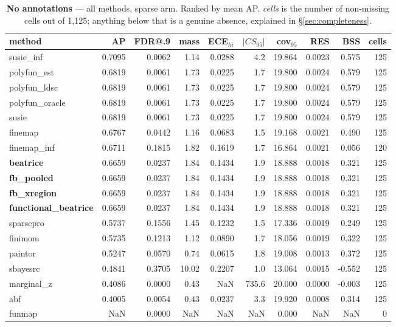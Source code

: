 \begin{table}[htbp]\centering\small
\caption{\textbf{No annotations} --- all methods, sparse arm. Ranked by mean AP. \emph{cells} is the number of non-missing cells out of 1{,}125; anything below that is a genuine absence, explained in \S\ref{sec:completeness}.}
\label{tab:main-none}
\begin{tabular}{lrrrrrrrr r}\toprule
method & AP & FDR@.9 & mass & ECE$_{hi}$ & $|CS_{95}|$ & cov$_{95}$ & RES & BSS & cells\\\midrule
susie\_inf & 0.7095 & 0.0062 & 1.14 & 0.0288 & 4.2 & 19.864 & 0.0023 & 0.575 & 125\\
polyfun\_est & 0.6819 & 0.0061 & 1.73 & 0.0225 & 1.7 & 19.800 & 0.0024 & 0.579 & 125\\
polyfun\_ldsc & 0.6819 & 0.0061 & 1.73 & 0.0225 & 1.7 & 19.800 & 0.0024 & 0.579 & 125\\
polyfun\_oracle & 0.6819 & 0.0061 & 1.73 & 0.0225 & 1.7 & 19.800 & 0.0024 & 0.579 & 125\\
susie & 0.6819 & 0.0061 & 1.73 & 0.0225 & 1.7 & 19.800 & 0.0024 & 0.579 & 125\\
finemap & 0.6767 & 0.0442 & 1.16 & 0.0683 & 1.5 & 19.168 & 0.0021 & 0.490 & 125\\
finemap\_inf & 0.6711 & 0.1815 & 1.82 & 0.1619 & 1.7 & 16.864 & 0.0021 & 0.056 & 120\\
\textbf{beatrice} & 0.6659 & 0.0237 & 1.84 & 0.1434 & 1.9 & 18.888 & 0.0018 & 0.321 & 125\\
\textbf{fb\_pooled} & 0.6659 & 0.0237 & 1.84 & 0.1434 & 1.9 & 18.888 & 0.0018 & 0.321 & 125\\
\textbf{fb\_xregion} & 0.6659 & 0.0237 & 1.84 & 0.1434 & 1.9 & 18.888 & 0.0018 & 0.321 & 125\\
\textbf{functional\_beatrice} & 0.6659 & 0.0237 & 1.84 & 0.1434 & 1.9 & 18.888 & 0.0018 & 0.321 & 125\\
sparsepro & 0.5737 & 0.1556 & 1.45 & 0.1232 & 1.5 & 17.336 & 0.0019 & 0.249 & 125\\
finimom & 0.5735 & 0.1213 & 1.12 & 0.0890 & 1.7 & 18.056 & 0.0019 & 0.322 & 125\\
paintor & 0.5247 & 0.0570 & 0.74 & 0.0615 & 1.8 & 19.008 & 0.0013 & 0.372 & 125\\
sbayesrc & 0.4841 & 0.3705 & 10.02 & 0.2207 & 1.0 & 13.064 & 0.0015 & -0.552 & 125\\
marginal\_z & 0.4086 & 0.0000 & 0.43 & NaN & 735.6 & 20.000 & 0.0000 & -0.003 & 125\\
abf & 0.4005 & 0.0054 & 0.43 & 0.0237 & 3.3 & 19.920 & 0.0008 & 0.314 & 125\\
funmap & NaN & 0.0000 & NaN & NaN & NaN & 0.000 & NaN & NaN & 0\\
\bottomrule\end{tabular}\end{table}
